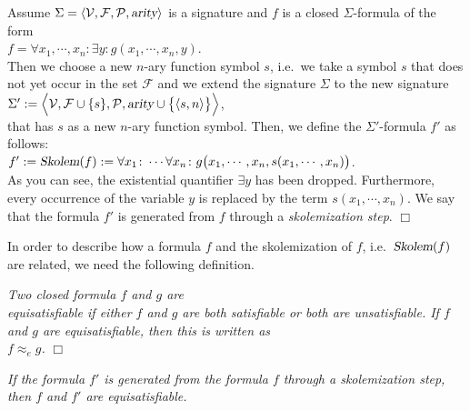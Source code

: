 \begin{Definition}[Skolemization]
Assume $\Sigma = \langle \mathcal{V}, \mathcal{F}, \mathcal{P}, \textsl{arity} \rangle$
is a signature and $f$ is a closed  $\Sigma$-formula of the form 
\\[0.2cm]
\hspace*{1.3cm} 
$f = \forall x_1, \cdots, x_n \colon \exists y \colon g(x_1, \cdots, x_n, y)$. 
\\[0.2cm]
Then we choose a new  $n$-ary function symbol $s$, i.e.~we take a symbol $s$ that does not
yet occur in the set $\mathcal{F}$ and we extend the signature $\Sigma$ to the new signature
\\[0.2cm]
\hspace*{1.3cm} 
$\Sigma' := \Bigl\langle \mathcal{V}, \mathcal{F} \cup \{s\}, \mathcal{P}, \textsl{arity}
\cup \bigl\{\pair(s,n)\bigr\} \Bigr\rangle$, 
\\[0.2cm]
that has  $s$ as a new $n$-ary function symbol.  Then, we define the  $\Sigma'$-formula
$f'$ as follows: \\[0.2cm]
\hspace*{1.3cm} 
$f' := \textsl{Skolem}(f) := 
\forall x_1 \colon \cdots \forall x_n \colon g\bigl(x_1, \cdots, x_n, s(x_1,\cdots,x_n)\bigr)$.
\\[0.2cm]
As you can see, the existential quantifier $\exists y$ has been dropped.  Furthermore,
every occurrence of the variable $y$ is replaced by the term $s(x_1,\cdots,x_n)$.  
We say that the formula  $f'$ is generated from $f$ through a \emph{skolemization step}.
\hspace*{\fill} $\Box$  
\end{Definition}

In order to describe how a formula $f$ and the skolemization of $f$, i.e.~$\textsl{Skolem}(f)$ are
related, we need the following definition.

\begin{Definition}[Equisatisfiability]
{\em
   Two closed formula $f$ and $g$ are \\
   \emph{equisatisfiable} if either $f$ and $g$ are both satisfiable or both are
   unsatisfiable.
   If  $f$ and $g$ are equisatisfiable, then this is written as
   \\[0.2cm]
   \hspace*{1.3cm} 
   $f \approx_e g$.
}  \hspace*{\fill} $\Box$
\end{Definition}


\noindent
\begin{Proposition}
{\em
  If the formula $f'$ is generated from the formula $f$ through a skolemization step, then
   $f$ and $f'$ are equisatisfiable.
}
\end{Proposition}

